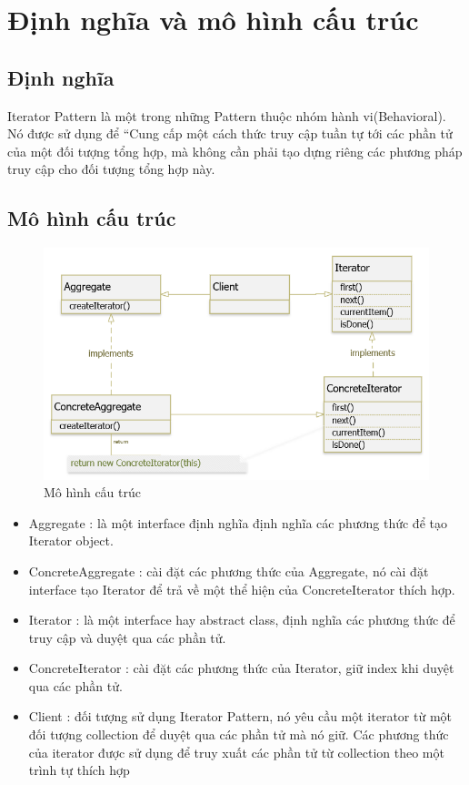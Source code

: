 \section{Định nghĩa và mô hình cấu trúc}
\subsection{Định nghĩa}
Iterator Pattern là một trong những Pattern thuộc nhóm hành vi(Behavioral). Nó được sử dụng để “Cung cấp một cách thức truy cập tuần tự tới các phần tử của một đối tượng tổng hợp, mà không cần phải tạo dựng riêng các phương pháp truy cập cho đối tượng tổng hợp này.

\subsection{Mô hình cấu trúc}
\begin{figure}[!htb]
    \centering
    \includegraphics[width=\textwidth]{fig/Iterator/structure_iterator.png}
    \caption{Mô hình cấu trúc}
    \label{fig:structure_iterator}
\end{figure}

\begin{itemize}
    \item Aggregate : là một interface định nghĩa định nghĩa các phương thức để tạo Iterator object.
    \item ConcreteAggregate : cài đặt các phương thức của Aggregate, nó cài đặt interface tạo Iterator để trả về một thể hiện của ConcreteIterator thích hợp.
    \item Iterator : là một interface hay abstract class, định nghĩa các phương thức để truy cập và duyệt qua các phần tử.
    \item ConcreteIterator : cài đặt các phương thức của Iterator, giữ index khi duyệt qua các phần tử.
    \item Client : đối tượng sử dụng Iterator Pattern, nó yêu cầu một iterator từ một đối tượng collection để duyệt qua các phần tử mà nó giữ. Các phương thức của iterator được sử dụng để truy xuất các phần tử từ collection theo một trình tự thích hợp
\end{itemize}

